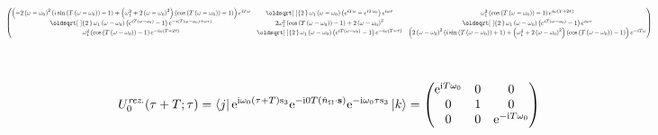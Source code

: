\documentclass[10pt,a4paper]{article}
\renewcommand*{\sqrt}[2][\ ]{\oldsqrt[#1]{#2\,}\,}
\newcommand{\const}[1]{\text{#1}}
\newcommand{\mat}[1]{
    \begin{pmatrix}
        #1
    \end{pmatrix}
}
\newcommand{\bra}[1]{\left< #1 \right|}
\newcommand{\ket}[1]{\left| #1 \right>}
\newcommand{\e}[1]{\const{e}^{#1}}
\renewcommand{\i}{\const{i}}
\begin{document}
\begin{gather*}
    \scalebox{0.5}{$\mat{\left(- 2 \left(\omega - \omega_{0}\right)^{2} \left(i \sin{\left(T \left(\omega - \omega_{0}\right) \right)} - 1\right) + \left(\omega_{1}^{2} + 2 \left(\omega - \omega_{0}\right)^{2}\right) \left(\cos{\left(T \left(\omega - \omega_{0}\right) \right)} - 1\right)\right) e^{i T \omega} & \sqrt{2} \omega_{1} \left(\omega - \omega_{0}\right) \left(e^{i T \omega} - e^{i T \omega_{0}}\right) e^{i \omega \tau} & \omega_{1}^{2} \left(\cos{\left(T \left(\omega - \omega_{0}\right) \right)} - 1\right) e^{i \omega \left(T + 2 \tau\right)}\\\sqrt{2} \omega_{1} \left(\omega - \omega_{0}\right) \left(e^{i T \left(\omega - \omega_{0}\right)} - 1\right) e^{- i \left(T \left(\omega - \omega_{0}\right) + \omega \tau\right)} & 2 \omega_{1}^{2} \left(\cos{\left(T \left(\omega - \omega_{0}\right) \right)} - 1\right) + 2 \left(\omega - \omega_{0}\right)^{2} & \sqrt{2} \omega_{1} \left(\omega - \omega_{0}\right) \left(e^{i T \left(\omega - \omega_{0}\right)} - 1\right) e^{i \omega \tau}\\\omega_{1}^{2} \left(\cos{\left(T \left(\omega - \omega_{0}\right) \right)} - 1\right) e^{- i \omega \left(T + 2 \tau\right)} & \sqrt{2} \omega_{1} \left(\omega - \omega_{0}\right) \left(e^{i T \left(\omega - \omega_{0}\right)} - 1\right) e^{- i \omega \left(T + \tau\right)} & \left(2 \left(\omega - \omega_{0}\right)^{2} \left(i \sin{\left(T \left(\omega - \omega_{0}\right) \right)} + 1\right) + \left(\omega_{1}^{2} + 2 \left(\omega - \omega_{0}\right)^{2}\right) \left(\cos{\left(T \left(\omega - \omega_{0}\right) \right)} - 1\right)\right) e^{- i T \omega}}$}
    \\
    \\
    \\
    U_0^\textit{rez.}(\tau + T; \tau) =
    \bra{j}
    \e{\i\omega_0 (\tau + T) \const{s}_3}
    \e{-\i 0 T \left(\hat{n}_\Omega \cdot \mathbf{s}\right)}
    \e{-\i\omega_0 \tau \const{s}_3}
    \ket{k} =
    \mat{\e{\i T \omega_0} & 0 & 0\\0 & 1 & 0\\0 & 0 & \e{- \i T \omega_0}}
    \\
\end{gather*}
\end{document}
